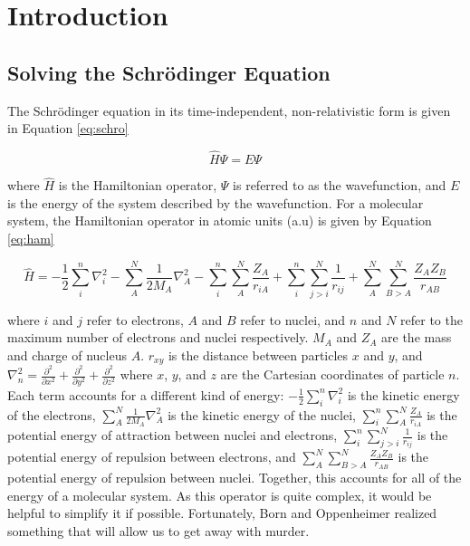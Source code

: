 \chapter{Introduction}
\section{Solving the Schr\"{o}dinger Equation}
The Schr\"{o}dinger equation\cite{1926PhRv...28.1049S} in its time-independent, non-relativistic form is given in Equation \ref{eq:schro} 

\begin{equation}
\label{eq:schro}
\hat{H}\Psi = E\Psi
\end{equation} 

where $\hat{H}$ is the Hamiltonian operator, $\Psi$ is referred to as the wavefunction, and $E$ is the energy of the system described by the wavefunction. For a molecular system, the Hamiltonian operator in atomic units (a.u) is given by Equation \ref{eq:ham}

\begin{equation}
\label{eq:ham}
\hat{H} = -\frac{1}{2}\sum^{n}_{i}\nabla^{2}_{i} - \sum^{N}_{A}\frac{1}{2M_{A}}\nabla^{2}_{A} - \sum^{n}_{i}\sum^{N}_{A}\frac{Z_{A}}{r_{iA}}
+ \sum^{n}_{i}\sum^{N}_{j>i}\frac{1}{r_{ij}} + \sum^{N}_{A}\sum^{N}_{B>A}\frac{Z_{A}Z_{B}}{r_{AB}}
\end{equation} 

where $i$ and $j$ refer to electrons, $A$ and $B$ refer to nuclei, and $n$ and $N$ refer to the maximum number of electrons and nuclei respectively. $M_{A}$ and $Z_{A}$ are the mass and charge of nucleus $A$. $r_{xy}$ is the distance between particles $x$ and $y$, and $\nabla^{2}_{n}=\frac{\partial^{2}}{\partial x^{2}}+\frac{\partial^{2}}{\partial y^{2}}+\frac{\partial^{2}}{\partial z^{2}}$ where $x$, $y$, and $z$ are the Cartesian coordinates of particle $n$. Each term accounts for a different kind of energy: $-\frac{1}{2}\sum^{n}_{i}\nabla^{2}_{i}$ is the kinetic energy of the electrons, $\sum^{N}_{A}\frac{1}{2M_{A}}\nabla^{2}_{A}$ is the kinetic energy of the nuclei, $\sum^{n}_{i}\sum^{N}_{A}\frac{Z_{A}}{r_{iA}}$ is the potential energy of attraction between nuclei and electrons, $\sum^{n}_{i}\sum^{N}_{j>i}\frac{1}{r_{ij}} $ is the potential energy of repulsion between electrons, and $\sum^{N}_{A}\sum^{N}_{B>A}\frac{Z_{A}Z_{B}}{r_{AB}}$ is the potential energy of repulsion between nuclei. Together, this accounts for all of the energy of a molecular system. As this operator is quite complex, it would be helpful to simplify it if possible. Fortunately, Born and Oppenheimer\cite{1927AnP...389..457B} realized something that will allow us to get away with murder.

